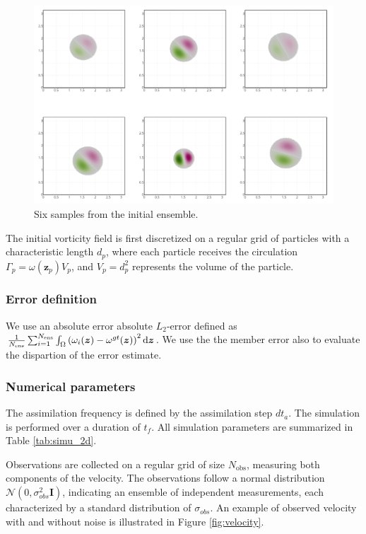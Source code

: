 \begin{figure}[ht]
	\centering
	\includegraphics[width=0.9\linewidth]{images/app2d/ensemble_sample.png}
	\caption{Six samples from the initial ensemble.}
	\label{fig:sample_ens}
\end{figure}

The initial vorticity field is first discretized on a regular grid of particles with a characteristic length $d_p$, where each particle receives the circulation $\Gamma_p = \omega(\bm z_p) V_p$, and $V_p = d_p^2$ represents the volume of the particle.

\subsubsection{Error definition}

We use an absolute error absolute \(L_2\)-error defined as $ \frac1{N_{\text{ens}}} \sum_{i = 1}^{N_{\text{ens}}} \int_\Omega \left(\omega_i(\bm{z}) - \omega^{gt}(\bm{z})\right)^2 \mathrm{d}\bm{z}$.
We use the the member error also to evaluate the dispartion of the error estimate.

\subsubsection{Numerical parameters}

The assimilation frequency is defined by the assimilation step $dt_a$. The simulation is performed over a duration of $t_f$. All simulation parameters are summarized in Table \ref{tab:simu_2d}.

Observations are collected on a regular grid of size $N_{\text{obs}}$, measuring both components of the velocity. The observations follow a normal distribution $\mathcal N(0, \sigma_{obs}^2 \bm{I})$, indicating an ensemble of independent measurements, each characterized by a standard distribution of $\sigma_{obs}$. An example of observed velocity with and without noise is illustrated in Figure \ref{fig:velocity}.


